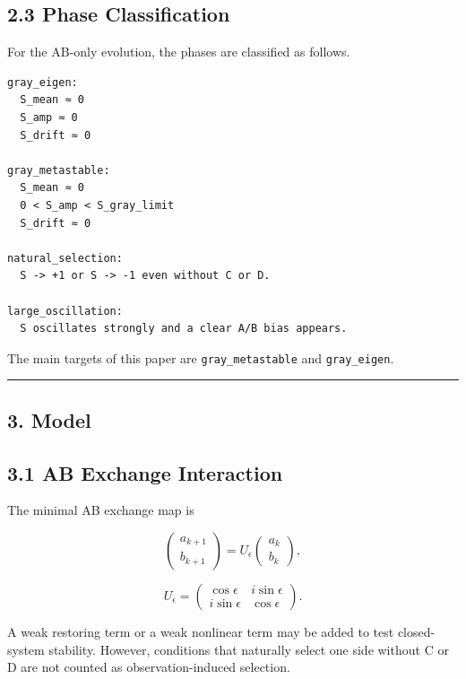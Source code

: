 \documentclass{article}
\begin{document}
\subsection{2.3 Phase Classification}\label{phase-classification}

For the AB-only evolution, the phases are classified as follows.

\begin{verbatim}
gray_eigen:
  S_mean ≈ 0
  S_amp ≈ 0
  S_drift ≈ 0

gray_metastable:
  S_mean ≈ 0
  0 < S_amp < S_gray_limit
  S_drift ≈ 0

natural_selection:
  S -> +1 or S -> -1 even without C or D.

large_oscillation:
  S oscillates strongly and a clear A/B bias appears.
\end{verbatim}

The main targets of this paper are \texttt{gray\_metastable} and
\texttt{gray\_eigen}.

\begin{center}\rule{0.5\linewidth}{0.5pt}\end{center}

\subsection{3. Model}\label{model}

\subsection{3.1 AB Exchange Interaction}\label{ab-exchange-interaction}

The minimal AB exchange map is

\[
\begin{pmatrix}
a_{k+1}\\
b_{k+1}
\end{pmatrix}
=
U_\epsilon
\begin{pmatrix}
a_k\\
b_k
\end{pmatrix},
\]

\[
U_\epsilon
=
\begin{pmatrix}
\cos\epsilon & i\sin\epsilon\\
i\sin\epsilon & \cos\epsilon
\end{pmatrix}.
\]

A weak restoring term or a weak nonlinear term may be added to test
closed-system stability. However, conditions that naturally select one
side without C or D are not counted as observation-induced selection.
\end{document}
